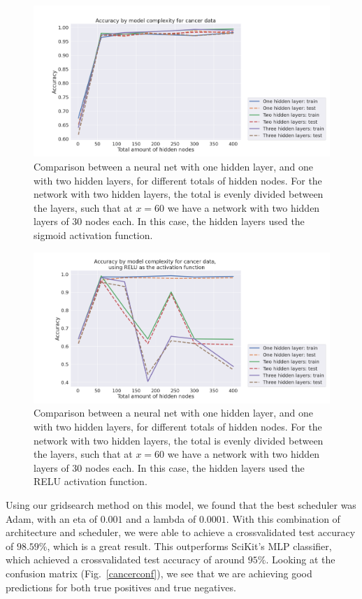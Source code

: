 \documentclass[onecolumn,10pt,cleanfoot]{asme2ej}
\begin{document}
\begin{figure}[H]
\centerline{\includegraphics[width=6in]{figure/cancerarchcompsigmoid.png}}
\caption{Comparison between a neural net with one hidden layer, and one with two hidden layers, for different totals of hidden nodes. For the network with two hidden layers, the total is evenly divided between the layers, such that at $x = 60$ we have a network with two hidden layers of 30 nodes each. In this case, the hidden layers used the sigmoid activation function.}
\label{cancerarchcompsigmoid}
\end{figure}

\begin{figure}[H]
\centerline{\includegraphics[width=6in]{figure/cancerarchcomp.png}}
\caption{Comparison between a neural net with one hidden layer, and one with two hidden layers, for different totals of hidden nodes. For the network with two hidden layers, the total is evenly divided between the layers, such that at $x = 60$ we have a network with two hidden layers of 30 nodes each. In this case, the hidden layers used the RELU activation function.}
\label{cancerarchcomp}
\end{figure}

Using our gridsearch method on this model, we found that the best scheduler was Adam, with an eta of $0.001$ and a lambda of $0.0001$. With this combination of architecture and scheduler, we were able to achieve a crossvalidated test accuracy of $98.59\%$, which is a great result. This outperforms SciKit's MLP classifier, which achieved a crossvalidated test accuracy of around $95\%$. Looking at the confusion matrix (Fig.~\ref{cancerconf}), we see that we are achieving good predictions for both true positives and true negatives.
\end{document}
